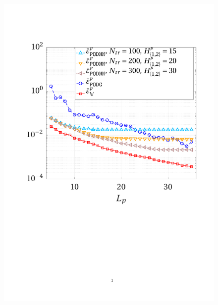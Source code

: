 \documentclass[longtitle]{elsarticle}
\numberwithin{equation}{section}
\theoremstyle{theorem}
\theoremstyle{definition}
\theoremstyle{remark}
\theoremstyle{proposition}
\numberwithin{figure}{section}
\begin{document}
\begin{figure}[t!]
			\includegraphics[scale = 0.37, trim = {2cm 9cm 1.5cm 3.5cm}, clip]{dc_200_p_error_vs_rank_ter} \\

\end{figure}
\end{document}
